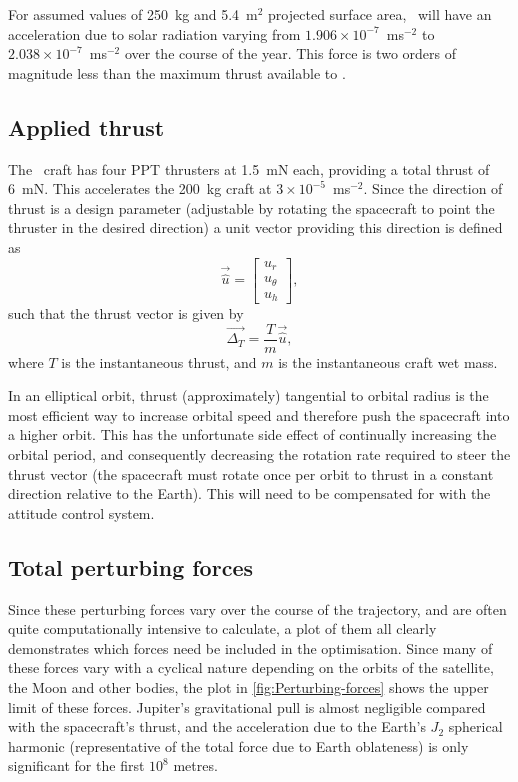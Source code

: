 For assumed values of 250~kg and 5.4~m$^2$ projected surface area, \BW\ will have an acceleration due to solar radiation varying from $1.906\times10^{-7}$~ms$^{-2}$ to $2.038\times10^{-7}$~ms$^{-2}$ over the course of the year. This force is two orders of magnitude less than the maximum thrust available to \BW.

 
 

\subsection{Applied thrust} \label{sub:Applied-Thrust}

The \BW\ craft has four PPT thrusters at 1.5~mN each, providing a total thrust of 6~mN. This accelerates the 200~kg craft at $3\times10^{-5}$~ms$^{-2}$. Since the direction of thrust is a design parameter (adjustable by rotating the spacecraft to point the thruster in the desired direction) a unit vector providing this direction is defined as
\begin{equation} \label{eq:thrust-vector}
\vec{\hat{u}}=\left[\begin{array}{c}
u_{r}\\
u_{\theta}\\
u_{h}
\end{array}\right],
\end{equation}
such that the thrust vector is given by
\begin{equation}
\vec{\Delta_{T}}=\frac{T}{m}\vec{\hat{u}} \label{eq:thrust-perturbation},
\end{equation}
where $T$ is the instantaneous thrust, and $m$ is the instantaneous craft wet mass.

In an elliptical orbit, thrust (approximately) tangential to orbital radius is the most efficient way to increase orbital speed and therefore push the spacecraft into a higher orbit. This has the unfortunate side effect of continually increasing the orbital period, and consequently decreasing the rotation rate required to steer the thrust vector (the spacecraft must rotate once per orbit to thrust in a constant direction relative to the Earth). This will need to be compensated for with the attitude control system.

\subsection{Total perturbing forces}

Since these perturbing forces vary over the course of the trajectory, and are often quite computationally intensive to calculate, a plot of them all clearly demonstrates which forces need be included in the optimisation. Since many of these forces vary with a cyclical nature depending on the orbits of the satellite, the Moon and other bodies, the plot in \autoref{fig:Perturbing-forces} shows the upper limit of these forces. Jupiter's gravitational pull is almost negligible compared with the spacecraft's thrust, and the acceleration due to the Earth's $J_{2}$ spherical harmonic (representative of the total force due to Earth oblateness) is only significant for the first $10^{8}$ metres.

